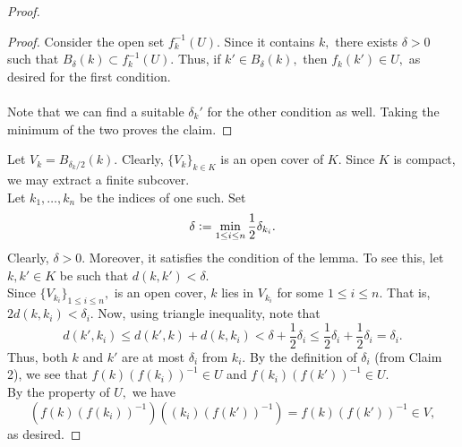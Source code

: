 \documentclass[12pt]{article}
\theoremstyle{definition}
\numberwithin{thm}{section}
\newenvironment{blockquote}
{\begin{mdframed}[skipabove=0pt, skipbelow=0pt, innertopmargin=4pt, innerbottommargin=4pt, bottomline=false,topline=false,rightline=false, linewidth=2pt]}
{\end{mdframed}}
\begin{document}
\begin{proof}
\begin{blockquote}
\begin{proof}
			Consider the open set $f_k^{-1}(U).$ Since it contains $k,$ there exists $\delta > 0$ such that $B_\delta(k) \subset f_k^{-1}(U).$ Thus, if $k' \in B_\delta(k),$ then $f_k(k') \in U,$ as desired for the first condition.\\~\\
			Note that we can find a suitable $\delta_k'$ for the other condition as well. Taking the minimum of the two proves the claim.
		\end{proof}
	\end{blockquote}
	Let $V_k = B_{\delta_k/2}(k).$ Clearly, $\{V_k\}_{k \in K}$ is an open cover of $K.$ Since $K$ is compact, we may extract a finite subcover.\\
	Let $k_1, \ldots, k_n$ be the indices of one such. Set 
	\begin{equation*} 
		\delta \vcentcolon= \min_{1 \le i \le n} \dfrac{1}{2}\delta_{k_i}.
	\end{equation*}
	Clearly, $\delta > 0.$ Moreover, it satisfies the condition of the lemma. To see this, let $k, k' \in K$ be such that $d(k, k') < \delta.$\\
	Since $\{V_{k_i}\}_{1 \le i \le n},$ is an open cover, $k$ lies in $V_{k_i}$ for some $1 \le i \le n.$ That is, $2d(k, k_i) < \delta_i.$ Now, using triangle inequality, note that
	\begin{equation*} 
		d(k', k_i) \le d(k', k) + d(k, k_i) < \delta + \frac{1}{2}\delta_i \le \dfrac{1}{2}\delta_i + \dfrac{1}{2}\delta_i = \delta_i.
	\end{equation*}
	Thus, both $k$ and $k'$ are at most $\delta_i$ from $k_i.$ By the definition of $\delta_i$ (from Claim 2), we see that $f(k)(f(k_i))^{-1} \in U$ and $f(k_i)(f(k'))^{-1} \in U.$\\
	By the property of $U,$ we have
	\begin{equation*} 
		(f(k)(f(k_i))^{-1})((k_i)(f(k'))^{-1}) = f(k)(f(k'))^{-1} \in V,
	\end{equation*}
	as desired.
\end{proof}
\end{document}
